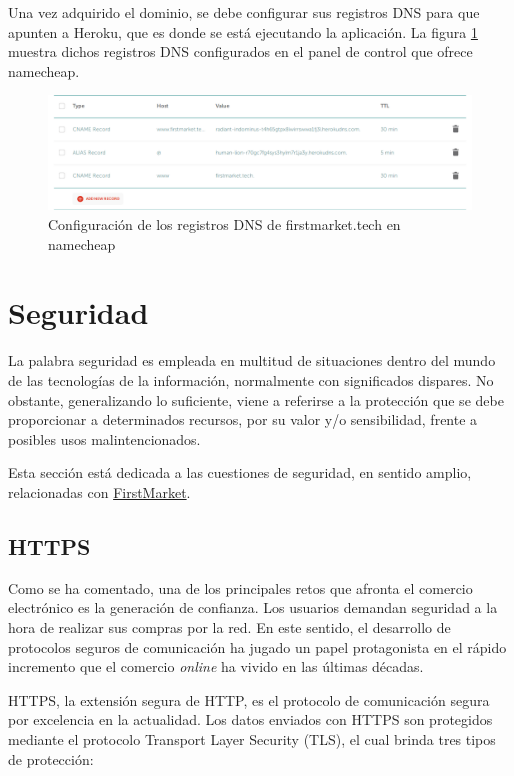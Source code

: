 \documentclass[a4paper]{article}
\begin{document}
	Una vez adquirido el dominio, se debe configurar sus registros DNS para que apunten a Heroku, que es donde se está ejecutando la aplicación. La figura \ref{fig:dns} muestra dichos registros DNS configurados en el panel de control que ofrece namecheap.
	
	\begin{figure}[hbt!]
		\centering
		\includegraphics[width=\textwidth,keepaspectratio]{dns}
		\caption{Configuración de los registros DNS de firstmarket.tech en namecheap}
		\label{fig:dns}
	\end{figure}

	\section{Seguridad} \label{sec:security}
	La palabra seguridad es empleada en multitud de situaciones dentro del mundo de las tecnologías de la información, normalmente con significados dispares. No obstante, generalizando lo suficiente, viene a referirse a la protección que se debe proporcionar a determinados recursos, por su valor y/o sensibilidad, frente a posibles usos malintencionados.
	
	Esta sección está dedicada a las cuestiones de seguridad, en sentido amplio, relacionadas con \href{https://firstmarket.tech}{FirstMarket}.
	\subsection{HTTPS} \label{sec:https}
	Como se ha comentado, una de los principales retos que afronta el comercio electrónico es la generación de confianza. Los usuarios demandan seguridad a la hora de realizar sus compras por la red. En este sentido, el desarrollo de protocolos seguros de comunicación ha jugado un papel protagonista en el rápido incremento que el comercio \emph{online} ha vivido en las últimas décadas.
	
	HTTPS, la extensión segura de HTTP, es el protocolo de comunicación segura por excelencia en la actualidad. Los datos enviados con HTTPS son protegidos mediante el protocolo Transport Layer Security (TLS), el cual brinda tres tipos de protección:
	
\end{document}

